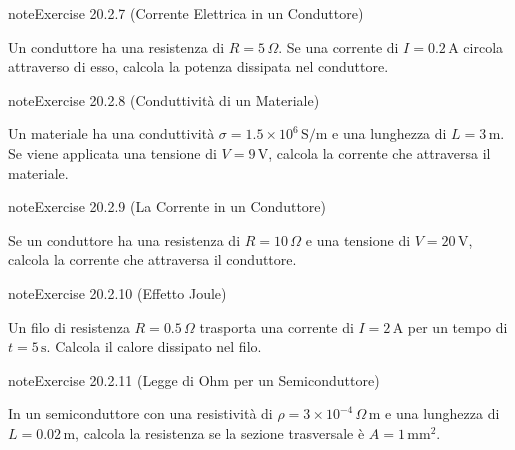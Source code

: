 \documentclass[letterpaper,10pt,italian]{jupyterBook}
\begin{document}
\begin{sphinxadmonition}{note}{Exercise 20.2.7 (Corrente Elettrica in un Conduttore)}



\sphinxAtStartPar
Un conduttore ha una resistenza di \(R = 5 \, \Omega\). Se una corrente di \(I = 0.2 \, \text{A}\) circola attraverso di esso, calcola la potenza dissipata nel conduttore.
\end{sphinxadmonition}
 \label{exercise:ch/electromagnetism/electric-current-problems-exercise-7}

\begin{sphinxadmonition}{note}{Exercise 20.2.8 (Conduttività di un Materiale)}



\sphinxAtStartPar
Un materiale ha una conduttività \(\sigma = 1.5 \times 10^6 \, \text{S/m}\) e una lunghezza di \(L = 3 \, \text{m}\). Se viene applicata una tensione di \(V = 9 \, \text{V}\), calcola la corrente che attraversa il materiale.
\end{sphinxadmonition}
 \label{exercise:ch/electromagnetism/electric-current-problems-exercise-8}

\begin{sphinxadmonition}{note}{Exercise 20.2.9 (La Corrente in un Conduttore)}



\sphinxAtStartPar
Se un conduttore ha una resistenza di \(R = 10 \, \Omega\) e una tensione di \(V = 20 \, \text{V}\), calcola la corrente che attraversa il conduttore.
\end{sphinxadmonition}
 \label{exercise:ch/electromagnetism/electric-current-problems-exercise-9}

\begin{sphinxadmonition}{note}{Exercise 20.2.10 (Effetto Joule)}



\sphinxAtStartPar
Un filo di resistenza \(R = 0.5 \, \Omega\) trasporta una corrente di \(I = 2 \, \text{A}\) per un tempo di \(t = 5 \, \text{s}\). Calcola il calore dissipato nel filo.
\end{sphinxadmonition}
 \label{exercise:ch/electromagnetism/electric-current-problems-exercise-10}

\begin{sphinxadmonition}{note}{Exercise 20.2.11 (Legge di Ohm per un Semiconduttore)}



\sphinxAtStartPar
In un semiconduttore con una resistività di \(\rho = 3 \times 10^{-4} \, \Omega \, \text{m}\) e una lunghezza di \(L = 0.02 \, \text{m}\), calcola la resistenza se la sezione trasversale è \(A = 1 \, \text{mm}^2\).
\end{sphinxadmonition}
 \label{exercise:ch/electromagnetism/electric-current-problems-exercise-11}
\end{document}
